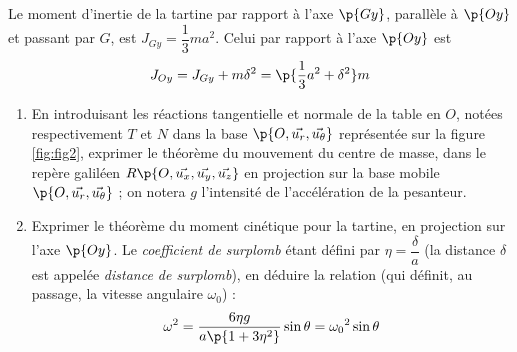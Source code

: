 \documentclass[a4paper,french,bookmarks]{article}
\begin{document}
    Le moment d'inertie de la tartine par rapport à l'axe $\p{Gy}$, parallèle à $\p{Oy}$ et passant par $G$, est $J_{Gy} = \dfrac{1}{3}ma^2$. Celui par rapport à l'axe $\p{Oy}$ est 
    \[ J_{Oy} = J_{Gy} + m\delta^2 = \p{\dfrac{1}{3}a^2 + \delta^2}m\]
    
    \begin{enumerate}
        \item En introduisant les réactions tangentielle et normale de la table en $O$, notées respectivement $T$ et $N$ dans la base $\p{O, \vec{u_r}, \vec{u_\theta}}$ représentée sur la figure \ref{fig:fig2}, exprimer le théorème du mouvement du centre de masse, dans le repère galiléen $R\p{O, \vec{u_x}, \vec{u_y}, \vec{u_z}}$ en projection sur la base mobile $\p{O, \vec{u_r}, \vec{u_\theta}}$  ; on notera $g$ l'intensité de l'accélération de la pesanteur.
        
        \noafter
        \nobefore\yesafter
        \boxansconc{
            \[ \dfrac{\dif \vec{v_g}}{\dif t} = \p{\p{g - \dfrac{N}{m}}\sin{\theta} -\dfrac{T}{m}\cos{\theta}}\vec{u_r} + \p{\p{g - \dfrac{N}{m}}\cos{\theta} +\dfrac{T}{m}\sin{\theta}}\vec{u_\theta}\]
        }
        \yesbefore
        
        \item Exprimer le théorème du moment cinétique pour la tartine, en projection sur l'axe $\p{Oy}$. Le \emph{coefficient de surplomb} étant défini par $\eta = \dfrac{\delta}{a}$ (la distance $\delta$ est appelée \emph{distance de surplomb}), en déduire la relation (qui définit, au passage, la vitesse angulaire $\omega_0$) :
        \begin{equation}
            \label{eq:eq1}
            \omega^2 = \dfrac{6\eta g}{a\p{1+3\eta^2}}\sin \theta = {\omega_0}^2 \sin \theta
        \end{equation}
        

\end{enumerate}
\end{document}
